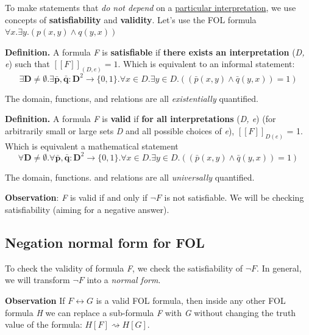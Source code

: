 \documentclass[11pt]{article}
\begin{document}
To make statements that \textit{do not depend} on a \underline{particular interpretation}, we use concepts of \textbf{satisfiability} and \textbf{validity}. Let's use the FOL formula $\forall x. \exists y. (p(x, y) \land q(y, x))$
\begin{tcolorbox}[
    enhanced,
    frame hidden,
    borderline west={2pt}{0pt}{black},
    boxsep=5pt,
    left=8pt
]
\textbf{Definition.} A formula \textit{F} is \textbf{satisfiable} if \textbf{there exists an interpretation} (\textit{D, e}) such that $[\![F]\!]_{(D, e)} = 1$. Which is equivalent to an informal statement: $$\exists \textbf{D} \neq \emptyset. \exists \bar{\textbf{p}}, \bar{\textbf{q}} : \textbf{D}^{2} \to \{0, 1\}. \forall x \in D. \exists y \in D. ((\bar{p}(x, y) \land \bar{q}(y, x)) = 1)$$

The domain, functions, and relations are all \textit{existentially} quantified. 
\end{tcolorbox}

\begin{tcolorbox}[
    enhanced,
    frame hidden,
    borderline west={2pt}{0pt}{black},
    boxsep=5pt,
    left=8pt
]
\textbf{Definition.} A formula \textit{F} is \textbf{valid} if \textbf{for all interpretations} (\textit{D, e}) (for arbitrarily small or large sets \textit{D} and all possible choices of \textit{e}), $[\![F]\!]_{D(e)}$ = 1. Which is equivalent a mathematical statement $$\forall \textbf{D} \neq \emptyset. \forall \bar{\textbf{p}}, \bar{\textbf{q}} : \textbf{D}^{2} \to \{0, 1\}. \forall x \in D. \exists y \in D. ((\bar{p}(x, y) \land \bar{q}(y, x)) = 1)$$

The domain, functions. and relations are all \textit{universally} quantified. 
\end{tcolorbox}

\textbf{Observation}: \textit{F} is valid if and only if $\neg F$ is not satisfiable. We will be checking satisfiability (aiming for a negative answer). 

\subsection*{Negation normal form for FOL}

To check the validity of formula \textit{F}, we check the satisfiability of $\neg F$. In general, we will transform $\neg F$ into a \textit{normal form}. 

\textbf{Observation} If $F \leftrightarrow G$ is a valid FOL formula, then inside any other FOL formula \textit{H} we can replace a sub-formula \textit{F} with \textit{G} without changing the truth value of the formula: $H[F] \rightsquigarrow H[G]$. 
\end{document}
